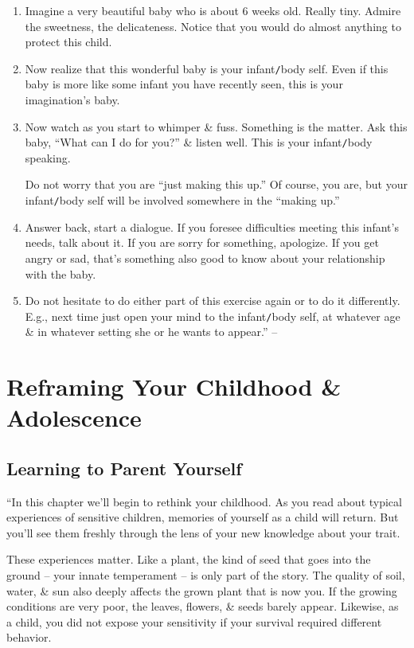 \documentclass{article}
\numberwithin{equation}{section}
\begin{document}
\begin{enumerate}
	\item Imagine a very beautiful baby who is about 6 weeks old. Really tiny. Admire the sweetness, the delicateness. Notice that you would do almost anything to protect this child.
	\item Now realize that this wonderful baby is your infant{\tt/}body self. Even if this baby is more like some infant you have recently seen, this is your imagination's baby.
	\item Now watch as you start to whimper \& fuss. Something is the matter. Ask this baby, ``What can I do for you?'' \& listen well. This is your infant{\tt/}body speaking.
	
	Do not worry that you are ``just making this up.'' Of course, you are, but your infant{\tt/}body self will be involved somewhere in the ``making up.''
	\item Answer back, start a dialogue. If you foresee difficulties meeting this infant's needs, talk about it. If you are sorry for something, apologize. If you get angry or sad, that's something also good to know about your relationship with the baby.
	\item Do not hesitate to do either part of this exercise again or to do it differently. E.g., next time just open your mind to the infant{\tt/}body self, at whatever age \& in whatever setting she or he wants to appear.'' -- \cite[pp. 96--98]{Aron2013}
\end{enumerate}


\section{Reframing Your Childhood \& Adolescence}

\subsection{Learning to Parent Yourself}
``In this chapter we'll begin to rethink your childhood. As you read about typical experiences of sensitive children, memories of yourself as a child will return. But you'll see them freshly through the lens of your new knowledge about your trait.

These experiences matter. Like a plant, the kind of seed that goes into the ground -- your innate temperament -- is only part of the story. The quality of soil, water, \& sun also deeply affects the grown plant that is now you. If the growing conditions are very poor, the leaves, flowers, \& seeds barely appear. Likewise, as a child, you did not expose your sensitivity if your survival required different behavior.
\end{document}

